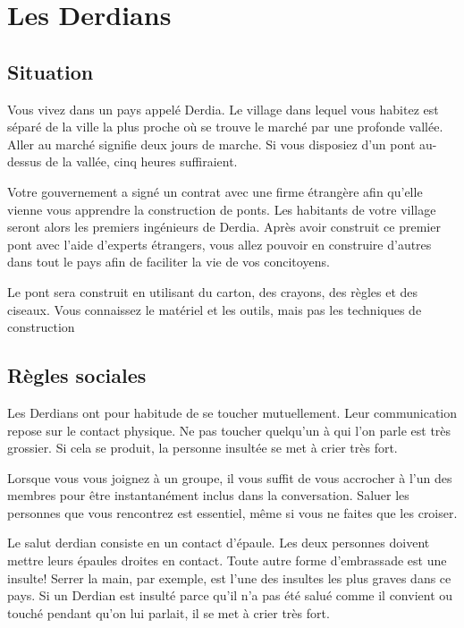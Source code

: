 \documentclass[11pt,a4paper]{article}
\begin{document}
\section{Les Derdians}

\subsection{Situation}

Vous vivez dans un pays appelé Derdia.
Le village dans lequel vous habitez est séparé de la ville la plus proche où se trouve le marché par une profonde vallée.
Aller au marché signifie deux jours de marche. Si vous disposiez d'un pont au-dessus de la vallée, cinq heures suffiraient.

Votre gouvernement a signé un contrat avec une firme étrangère afin qu'elle vienne vous apprendre la construction de ponts.
Les habitants de votre village seront alors les premiers ingénieurs de Derdia.
Après avoir construit ce premier pont avec l'aide d'experts étrangers, vous allez pouvoir en construire d'autres dans tout le pays afin de faciliter la vie de vos concitoyens.

Le pont sera construit en utilisant du carton, des crayons, des règles et des ciseaux.
Vous connaissez le matériel et les outils, mais pas les techniques de construction

\subsection{Règles sociales}

Les Derdians ont pour habitude de se toucher mutuellement.
Leur communication repose sur le contact physique.
Ne pas toucher quelqu'un à qui l'on parle est très grossier.
Si cela se produit, la personne insultée se met à crier très fort.

Lorsque vous vous joignez à un groupe, il vous suffit de vous accrocher à l'un des membres pour être instantanément inclus dans la conversation.
Saluer les personnes que vous rencontrez est essentiel, même si vous ne faites que les croiser.

Le salut derdian consiste en un contact d'épaule.
Les deux personnes doivent mettre leurs épaules droites en contact.
Toute autre forme d'embrassade est une insulte! Serrer la main, par exemple, est l'une des insultes les plus graves dans ce pays.
Si un Derdian est insulté parce qu'il n'a pas été salué comme il convient ou touché pendant qu'on lui parlait, il se met à crier très fort.
\end{document}

